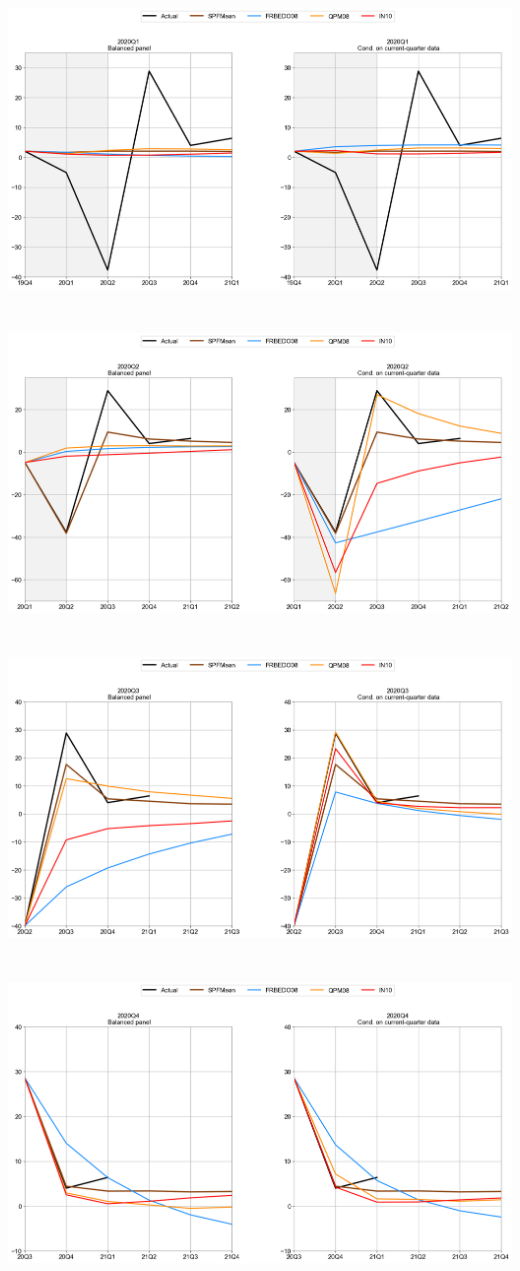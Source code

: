 \documentclass{article}
\begin{document}
\includegraphics[scale=0.5]{Top3_models_cql_2020Q1}\\ \bigskip \\ \bigskip  \\
\includegraphics[scale=0.5]{Top3_models_cql_2020Q2}\\  \bigskip \\ \bigskip  \\
\includegraphics[scale=0.5]{Top3_models_cql_2020Q3}\\  \bigskip \\ \bigskip  \\
\includegraphics[scale=0.5]{Top3_models_cql_2020Q4}\\ \bigskip \\ \bigskip  \\
\end{document}
